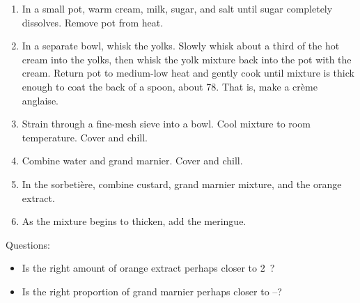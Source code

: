 

\begin{ingredients}
\end{ingredients}


\begin{recipe}
  \begin{enumerate}

  \item In a small pot, warm cream, milk, sugar, and salt until sugar
    completely dissolves.  Remove pot from heat.

  \item In a separate bowl, whisk the yolks.  Slowly whisk about a
    third of the hot cream into the yolks, then whisk the yolk mixture
    back into the pot with the cream. Return pot to medium-low heat
    and gently cook until mixture is thick enough to coat the back of
    a spoon, about 78\degreeC.  That is, make a crème anglaise.

  \item Strain through a fine-mesh sieve into a bowl. Cool mixture to
    room temperature. Cover and chill.
    
  \item Combine water and grand marnier.  Cover and chill.

  \item In the sorbetière, combine custard, grand marnier mixture, and
    the orange extract.

  \item As the mixture begins to thicken, add the meringue.

  \end{enumerate}
\end{recipe}

Questions:
\begin{itemize}
\item Is the right amount of orange extract perhaps closer to 2~\tsp?
\item Is the right proportion of grand marnier perhaps closer to \fracT--\fracTT?
\end{itemize}


